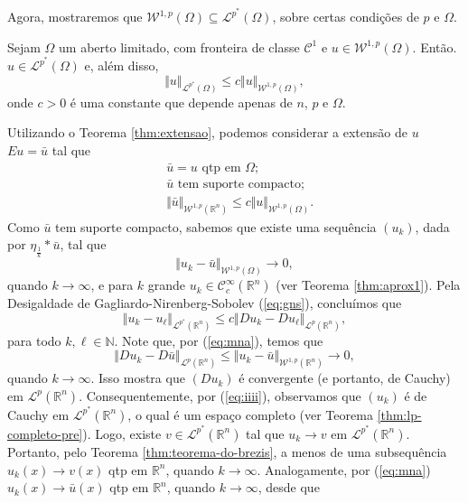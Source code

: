 \documentclass[a4paper, 11pt]{book}
\theoremstyle{definition}
\newcommand{\bN}{\mathbb{N}}
\newcommand{\bR}{\mathbb{R}}
\newcommand{\cC}{\mathcal{C}}
\newcommand{\cL}{\mathcal{L}}
\newcommand{\cW}{\mathcal{W}}
\begin{document}
Agora, mostraremos que $\cW^{1,p}(\Omega) \subseteq \cL^{p^*}(\Omega)$, sobre certas condições de $p$ e $\Omega$.

\begin{tbox} \label{thm:desigualdade-teorema-2}
    Sejam $\Omega$ um aberto limitado, com fronteira de classe $\cC^1$ e $u \in \cW^{1,p}(\Omega)$. Então. $u \in \cL^{p^*}(\Omega)$ e, além disso,
    \[
        \Vert u \Vert_{\cL^{p^*}(\Omega)} \leqslant c \Vert u \Vert_{\cW^{1,p}(\Omega)},
    \]
    onde $c > 0$ é uma constante que depende apenas de $n$, $p$ e $\Omega$.
\end{tbox}
\begin{prf}
    Utilizando o Teorema \ref{thm:extensao}, podemos considerar a extensão de $u$ $Eu = \bar u$ tal que
    \begin{equation} \label{eq:man}
        \begin{aligned}
            &\bar u = u \text{ qtp em } \Omega;\\
            &\bar u \text{ tem suporte compacto};\\
            &\Vert \bar u \Vert_{\cW^{1,p}(\bR^n)} \leqslant c\Vert u \Vert_{\cW^{1,p}(\Omega)}.
        \end{aligned}
    \end{equation}
    Como $\bar u$ tem suporte compacto, sabemos que existe uma sequência $(u_k)$, dada por $\eta_{\frac{1}{k}} * \bar u$, tal que
    \begin{equation} \label{eq:mna}
        \Vert u_k - \bar u \Vert_{\cW^{1,p}(\Omega)} \to 0,
    \end{equation}
    quando $k \to \infty$,
    e para $k$ grande $u_k \in \cC^{\infty}_c(\bR^n)$ (ver Teorema \ref{thm:aprox1}).
    Pela Desigaldade de Gagliardo-Nirenberg-Sobolev (\ref{eq:gns}), concluímos que
    \begin{equation} \label{eq:iiii}
        \Vert u_k - u_\ell \Vert_{\cL^{p^*}(\bR^n)} \leqslant c \Vert Du_k - Du_\ell \Vert_{\cL^p(\bR^n)},
    \end{equation}
    para todo $k, \ell \in \bN$.
    Note que, por (\ref{eq:mna}), temos que
    \begin{equation} \label{eq:jjj}
        \Vert Du_k - D\bar u \Vert_{\cL^p(\bR^n)} \leqslant \Vert u_k - \bar u \Vert_{\cW^{1,p}(\bR^n)} \to 0, 
    \end{equation}
    quando $k \to \infty$.
    Isso mostra que $(Du_k)$ é convergente (e portanto, de Cauchy) em $\cL^p(\bR^n)$.
    Consequentemente, por (\ref{eq:iiii}), observamos que $(u_k)$ é de Cauchy em $\cL^{p^*}(\bR^n)$, o qual é um espaço completo (ver Teorema \ref{thm:lp-completo-pre}). Logo, existe $v \in \cL^{p^*}(\bR^n)$ tal que $u_k \to v$ em $\cL^{p^*}(\bR^n)$. Portanto, pelo Teorema \ref{thm:teorema-do-brezis}, a menos de uma subsequência $u_k(x) \to v(x)$ qtp em $\bR^n$, quando $k \to \infty$. Analogamente, por (\ref{eq:mna}) $u_k(x) \to \bar u(x)$ qtp em $\bR^n$, quando $k \to \infty$, desde que

\end{prf}
\end{document}
